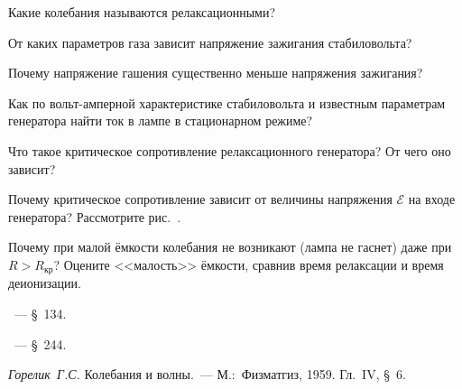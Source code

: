 \begin{lab:questions}
	\item Какие колебания называются релаксационными?

	\item От каких параметров газа зависит напряжение зажигания стабиловольта?

	\item Почему напряжение гашения существенно меньше напряжения зажигания?


	\item Как по вольт-амперной характеристике стабиловольта и известным
параметрам генератора найти ток в лампе в стационарном
режиме?

	\item Что такое критическое сопротивление релаксационного генератора? От
чего оно зависит?

	\item Почему критическое сопротивление зависит от величины напряжения $\mathcal{E}$ на
входе генератора? Рассмотрите рис.~.

	\item Почему при малой ёмкости колебания не возникают (лампа не гаснет) даже
при $R>R_{\text{кр}}$? Оцените <<малость>> ёмкости,
сравнив время релаксации и время деионизации.
\end{lab:questions}


\begin{lab:literature}

	\item \SivuhinIII~--- \S~134.

	\item \Kalashnikov~--- \S~244.

	\item \emph{Горелик~Г.С.} Колебания и волны.~--- М.:~Физматгиз, 1959.
Гл.~IV, \S~6.
\end{lab:literature}
